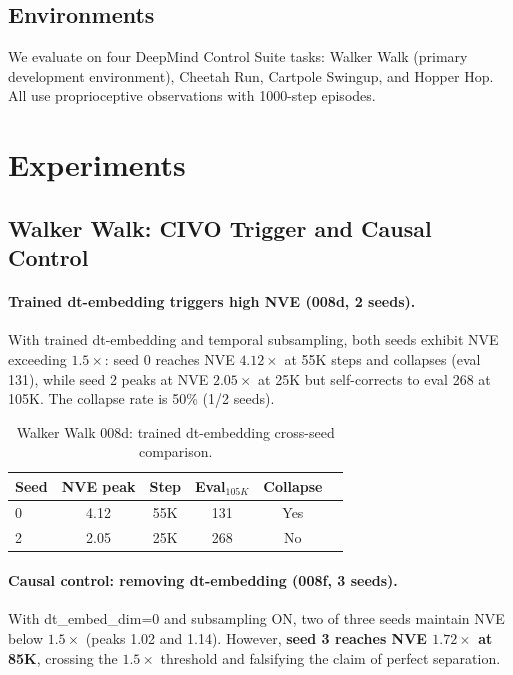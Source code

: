 \documentclass[10pt,twocolumn]{article}
\begin{document}
\subsection{Environments}

We evaluate on four DeepMind Control Suite tasks: Walker Walk (primary development environment), Cheetah Run, Cartpole Swingup, and Hopper Hop. All use proprioceptive observations with 1000-step episodes.

\section{Experiments}

\subsection{Walker Walk: CIVO Trigger and Causal Control}
\label{sec:walker-civo}

\paragraph{Trained dt-embedding triggers high NVE (008d, 2 seeds).}
With trained dt-embedding and temporal subsampling, both seeds exhibit NVE exceeding $1.5\times$: seed 0 reaches NVE $4.12\times$ at 55K steps and collapses (eval 131), while seed 2 peaks at NVE $2.05\times$ at 25K but self-corrects to eval 268 at 105K. The collapse rate is 50\% (1/2 seeds).

\begin{table}[h]
\centering
\caption{Walker Walk 008d: trained dt-embedding cross-seed comparison.}
\label{tab:008d}
\begin{tabular}{lccccc}
\toprule
Seed & NVE peak & Step & Eval$_{105K}$ & Collapse \\
\midrule
0 & 4.12 & 55K & 131 & Yes \\
2 & 2.05 & 25K & 268 & No \\
\bottomrule
\end{tabular}
\end{table}

\paragraph{Causal control: removing dt-embedding (008f, 3 seeds).}
With dt\_embed\_dim=0 and subsampling ON, two of three seeds maintain NVE below $1.5\times$ (peaks 1.02 and 1.14). However, \textbf{seed 3 reaches NVE $1.72\times$ at 85K}, crossing the $1.5\times$ threshold and falsifying the claim of perfect separation.
\end{document}
